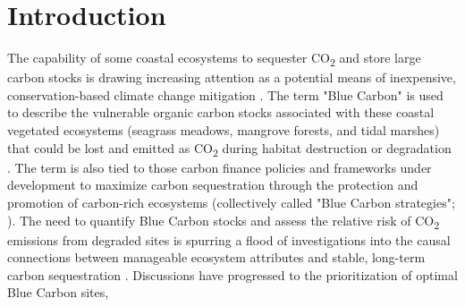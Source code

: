 \section{Introduction}

The capability of some coastal ecosystems to sequester CO\textsubscript{2} and store large carbon stocks is drawing increasing attention as a potential means of inexpensive, conservation-based climate change mitigation \citep{Hiraishi:2014uo}. The term "Blue Carbon" is used to describe the vulnerable organic carbon stocks associated with these coastal vegetated ecosystems (seagrass meadows, mangrove forests, and tidal marshes) that could be lost and emitted as CO\textsubscript{2} during habitat destruction or degradation \citep{Mcleod:2011gs}. The term is also tied to those carbon finance policies and frameworks under development to maximize carbon sequestration through the protection and promotion of carbon-rich ecosystems (collectively called "Blue Carbon strategies"; \citealt{Pendleton:2012hz}). The need to quantify Blue Carbon stocks and assess the relative risk of CO\textsubscript{2} emissions from degraded sites is spurring a flood of investigations into the causal connections between manageable ecosystem attributes and stable, long-term carbon sequestration \citep{Howard:2017jz, Macreadie:2017dt}. Discussions have progressed to the prioritization of optimal Blue Carbon sites, 
